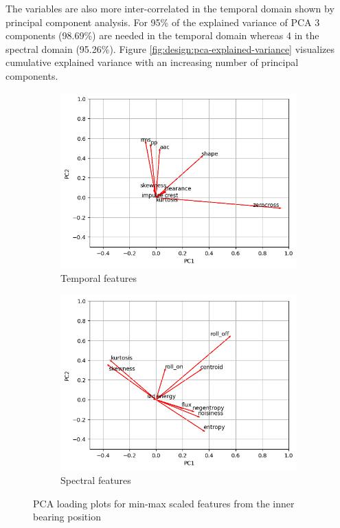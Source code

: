 The variables are also more inter-correlated in the temporal domain shown by principal component analysis. For 95\% of the explained variance of PCA 3 components (98.69\%) are needed in the temporal domain whereas 4 in the spectral domain (95.26\%). Figure \ref{fig:design:pca-explained-variance} visualizes cumulative explained variance with an increasing number of principal components. 

\begin{figure}[h!]
    \centering
    \begin{subfigure}[b]{0.49\textwidth}
        \includegraphics[width=\textwidth]{assets/design/pca-loading-plot-temporal.png}
        \caption{Temporal features}
    \end{subfigure}
    \hfill
    \begin{subfigure}[b]{0.49\textwidth}
        \includegraphics[width=\textwidth]{assets/design/pca-loading-plot-spectral.png}
        \caption{Spectral features}
    \end{subfigure}
    \caption{PCA loading plots for min-max scaled features from the inner bearing position}
    \label{fig:design:pca-loading-plot} 
\end{figure}

